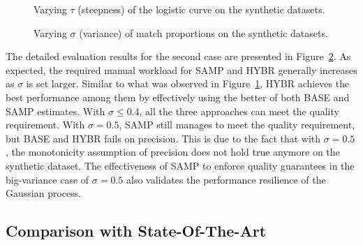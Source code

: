 \begin{figure}
\setlength{\abovecaptionskip}{\figcaptionspace}
\centering
{}
\caption{Varying $\tau$ (steepness) of the logistic curve on the synthetic datasets.}
\label{fig:synthetic-experiment}
\vspace{-0.3cm}
\end{figure}

\begin{figure}
\setlength{\abovecaptionskip}{\figcaptionspace}
\centering
{}
\caption{Varying $\sigma$ (variance) of match proportions on the synthetic datasets.}
\label{fig:synthetic-noise-level}
\vspace{-0.55cm}
\end{figure}

 The detailed evaluation results for the second case are presented in Figure~\ref{fig:synthetic-noise-level}. As expected, the required manual workload for SAMP and HYBR generally increases as $\sigma$ is set larger. Similar to what was observed in Figure~\ref{fig:synthetic-experiment}, HYBR achieves the best performance among them by effectively using the better of both BASE and SAMP estimates. With $\sigma\leq 0.4$, all the three approaches can meet the quality requirement. With $\sigma=0.5$, SAMP still manages to meet the quality requirement, but BASE and HYBR fails on precision. This is due to the fact that with $\sigma=0.5$, the monotonicity assumption of precision does not hold true anymore on the synthetic dataset. The effectiveness of SAMP to enforce quality guarantees in the big-variance case of $\sigma=0.5$ also validates the performance resilience of the Gaussian process.

\subsection{Comparison with State-Of-The-Art} \label{sec:other-comparison}

